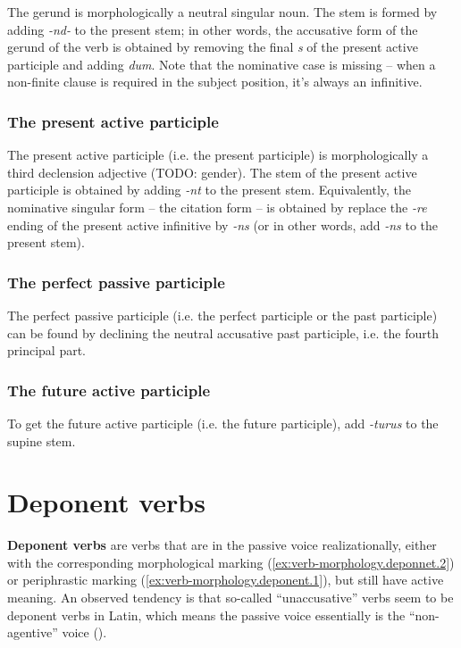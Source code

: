 \documentclass[a4paper, oneside]{report}
\newcommand*{\concept}[1]{\textbf{#1}}
\newcommand{\form}[1]{\emph{#1}}
\begin{document}
The gerund is morphologically a neutral singular noun.
The stem is formed by 
adding \form{-nd-} to the present stem;
in other words, 
the accusative form of the gerund of the verb 
is obtained by removing the final \form{s} 
of the present active participle 
and adding \form{dum}.
Note that the nominative case is missing -- 
when a non-finite clause is required in the subject position,
it's always an infinitive.

\subsubsection{The present active participle}

The present active participle (i.e. the present participle) 
is morphologically a third declension adjective (TODO: gender).
The stem of the present active participle 
is obtained by adding \form{-nt} to the present stem.
Equivalently, the nominative singular form -- the citation form --
is obtained by replace the \form{-re} ending of the present active infinitive by \form{-ns}
(or in other words, add \form{-ns} to the present stem).

\subsubsection{The perfect passive participle}

The perfect passive participle (i.e. the perfect participle or the past participle)
can be found by declining the neutral accusative past participle, 
i.e. the fourth principal part.

\subsubsection{The future active participle}

To get the future active participle (i.e. the future participle), add \form{-turus} to the supine stem.

\section{Deponent verbs}\label{sec:deponent-verbs}

\concept{Deponent verbs} are verbs that are in the passive voice realizationally,
either with the corresponding morphological marking (\ref{ex:verb-morphology.deponnet.2})
or periphrastic marking (\ref{ex:verb-morphology.deponent.1}),
but still have active meaning.
An observed tendency is that 
so-called ``unaccusative'' verbs
seem to be deponent verbs in Latin,
which means the passive voice essentially is the 
``non-agentive'' voice ().
\end{document}

